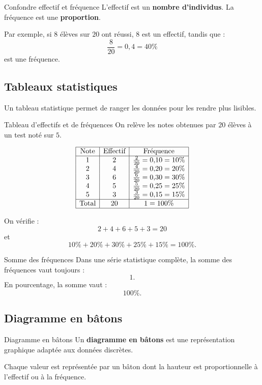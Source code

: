 \documentclass[11pt,a4paper]{article}
\begin{document}
\begin{warningbox}{Confondre effectif et fréquence}
L'effectif est un \textbf{nombre d'individus}.  
La fréquence est une \textbf{proportion}.  

Par exemple, si $8$ élèves sur $20$ ont réussi, $8$ est un effectif, tandis que :
\[
\frac{8}{20}=0{,}4=40\%
\]
est une fréquence.
\end{warningbox}

\subsection{Tableaux statistiques}

Un tableau statistique permet de ranger les données pour les rendre plus lisibles.

\begin{examplebox}{Tableau d'effectifs et de fréquences}
On relève les notes obtenues par $20$ élèves à un test noté sur $5$.

\[
\begin{array}{|c|c|c|}
\hline
\text{Note} & \text{Effectif} & \text{Fréquence} \\
\hline
1 & 2 & \frac{2}{20}=0{,}10=10\% \\
2 & 4 & \frac{4}{20}=0{,}20=20\% \\
3 & 6 & \frac{6}{20}=0{,}30=30\% \\
4 & 5 & \frac{5}{20}=0{,}25=25\% \\
5 & 3 & \frac{3}{20}=0{,}15=15\% \\
\hline
\text{Total} & 20 & 1=100\% \\
\hline
\end{array}
\]

On vérifie :
\[
2+4+6+5+3=20
\]
et
\[
10\%+20\%+30\%+25\%+15\%=100\%.
\]
\end{examplebox}

\begin{retenirbox}{Somme des fréquences}
Dans une série statistique complète, la somme des fréquences vaut toujours :
\[
1.
\]
En pourcentage, la somme vaut :
\[
100\%.
\]
\end{retenirbox}

\subsection{Diagramme en bâtons}

\begin{definitionbox}{Diagramme en bâtons}
Un \textbf{diagramme en bâtons} est une représentation graphique adaptée aux données discrètes.

Chaque valeur est représentée par un bâton dont la hauteur est proportionnelle à l'effectif ou à la fréquence.
\end{definitionbox}
\end{document}
